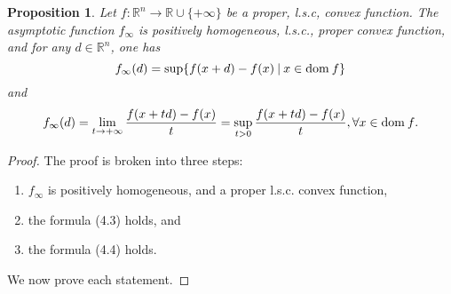 \documentclass[a4paper,11pt, oneside]{book}
\newtheorem{prop}[thm]{Proposition}
\theoremstyle{definition}
\newcommand{\RealNumberSet}{\mathbb{R}}
\newcommand{\NDemenstionalRealEuclideanSpace}{\mathbb{R}^n}
\newcommand{\Domain}[1]{\text{\rm dom\:${#1}$}} %
\newcommand{\ExtendedRealValuedFunction}[2]{{#1}: {#2} \to \RealNumberSet \cup \{+\infty\}}
\begin{document}
\begin{prop}
  Let $\ExtendedRealValuedFunction{f}{\NDemenstionalRealEuclideanSpace}$ be a proper, l.s.c, convex function. The asymptotic function $f_{\infty}$ is positively homogeneous, l.s.c., proper convex function, and for any $d \in \NDemenstionalRealEuclideanSpace$, one has
  \begin{equation}
    f_{\infty}(d) = \sup \{f(x+d) -f(x) \:|\: x \in \Domain{f}\}
  \end{equation}
  and
  \begin{equation}
    f_{\infty}(d) = \lim_{t \to +\infty} \frac{f(x+td) -f(x)}{t} = \sup_{t>0} \frac{f(x+td) - f(x)}{t}, \forall x \in \Domain{f}.
  \end{equation}
\end{prop}

\begin{proof}
  The proof is broken into three steps:
  \begin{enumerate}[label=\roman*,align=CenterWithParen]
    \item $f_{\infty}$ is positively homogeneous, and a proper l.s.c. convex function,
    \item the formula (4.3) holds, and
    \item the formula (4.4) holds.
  \end{enumerate}

  We now prove each statement.


\end{proof}
\end{document}
